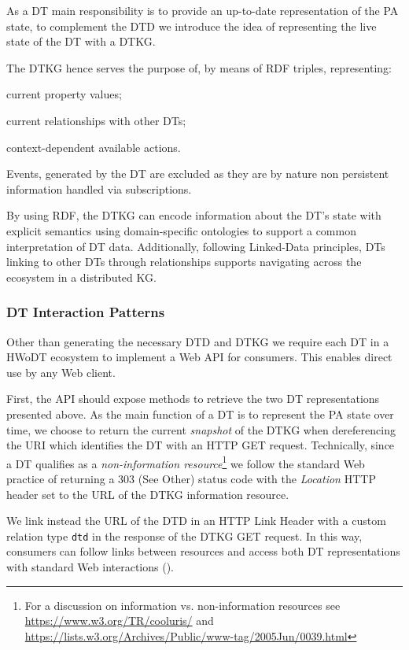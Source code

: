 As a \ac{DT} main responsibility is to provide an up-to-date representation of the \ac{PA} state, to complement the \ac{DTD} we introduce the idea of representing the live state of the \ac{DT} with a \ac{DTKG}. 

The \ac{DTKG} hence serves the purpose of, by means of \ac{RDF} triples, representing:
\begin{inlinelist}
    \item current property values;
    \item current relationships with other \acp{DT};
    \item context-dependent available actions.
\end{inlinelist}
Events, generated by the \ac{DT} are excluded as they are by nature non persistent information handled via subscriptions.

By using \ac{RDF}, the \ac{DTKG} can encode information about the \ac{DT}'s state with explicit semantics using domain-specific ontologies to support a common interpretation of \ac{DT} data.
Additionally, following Linked-Data principles, \acp{DT} linking to other \acp{DT} through relationships supports navigating across the ecosystem in a distributed \ac{KG}.

\subsubsection{\acl{DT} Interaction Patterns}

Other than generating the necessary \ac{DTD} and \ac{DTKG} we require each \ac{DT} in a \ac{HWoDT} ecosystem to implement a Web \ac{API} for consumers. This enables direct use by any Web client.

First, the \ac{API} should expose methods to retrieve the two \ac{DT} representations presented above.
%
As the main function of a \ac{DT} is to represent the \ac{PA} state over time, we choose to return the current \emph{snapshot} of the \ac{DTKG} when dereferencing the \ac{URI} which identifies the \ac{DT} with an HTTP GET request.
%
Technically, since a \ac{DT} qualifies as a \emph{non-information resource}\footnote{For a discussion on information vs. non-information resources see \url{https://www.w3.org/TR/cooluris/} and \url{https://lists.w3.org/Archives/Public/www-tag/2005Jun/0039.html}}
we follow the standard Web practice of returning a 303 (See Other) status code with the \textit{Location} HTTP header set to the \ac{URL} of the \ac{DTKG} information resource.

We link instead the \ac{URL} of the \ac{DTD} in an HTTP Link Header with a custom relation type \texttt{dtd} in the response of the \ac{DTKG} GET request.
%
In this way, consumers can follow links between resources and access both \ac{DT} representations with standard Web interactions  ().

